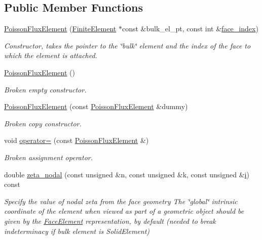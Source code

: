 \subsection*{Public Member Functions}
\begin{DoxyCompactItemize}
\item 
\hyperlink{classoomph_1_1PoissonFluxElement_a484772fcf9b2488d6c8e6d8d0c1c95db}{Poisson\+Flux\+Element} (\hyperlink{classoomph_1_1FiniteElement}{Finite\+Element} $\ast$const \&bulk\+\_\+el\+\_\+pt, const int \&\hyperlink{classoomph_1_1FaceElement_a478d577ac6db67ecc80f1f02ae3ab170}{face\+\_\+index})
\begin{DoxyCompactList}\small\item\em Constructor, takes the pointer to the \char`\"{}bulk\char`\"{} element and the index of the face to which the element is attached. \end{DoxyCompactList}\item 
\hyperlink{classoomph_1_1PoissonFluxElement_a137480da853112a2180a9eafb30ace49}{Poisson\+Flux\+Element} ()
\begin{DoxyCompactList}\small\item\em Broken empty constructor. \end{DoxyCompactList}\item 
\hyperlink{classoomph_1_1PoissonFluxElement_a82c6268bcf26d0a44ff55650a5e57bc3}{Poisson\+Flux\+Element} (const \hyperlink{classoomph_1_1PoissonFluxElement}{Poisson\+Flux\+Element} \&dummy)
\begin{DoxyCompactList}\small\item\em Broken copy constructor. \end{DoxyCompactList}\item 
void \hyperlink{classoomph_1_1PoissonFluxElement_a036738c2637082cbc51a8362fab1e276}{operator=} (const \hyperlink{classoomph_1_1PoissonFluxElement}{Poisson\+Flux\+Element} \&)
\begin{DoxyCompactList}\small\item\em Broken assignment operator. \end{DoxyCompactList}\item 
double \hyperlink{classoomph_1_1PoissonFluxElement_acf4651fa89a7f6c5a23c1960423dc8e6}{zeta\+\_\+nodal} (const unsigned \&n, const unsigned \&k, const unsigned \&\hyperlink{cfortran_8h_adb50e893b86b3e55e751a42eab3cba82}{i}) const
\begin{DoxyCompactList}\small\item\em Specify the value of nodal zeta from the face geometry The \char`\"{}global\char`\"{} intrinsic coordinate of the element when viewed as part of a geometric object should be given by the \hyperlink{classoomph_1_1FaceElement}{Face\+Element} representation, by default (needed to break indeterminacy if bulk element is Solid\+Element) \end{DoxyCompactList}\item 

\end{DoxyCompactItemize}
